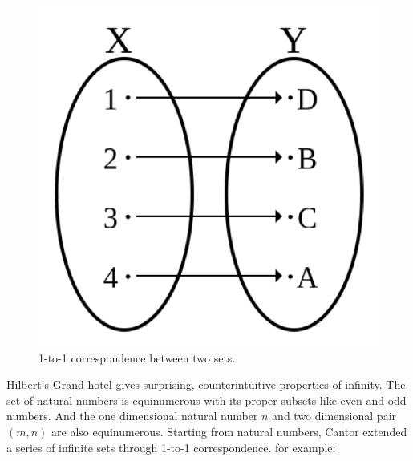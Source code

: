 \documentclass{article}
\begin{document}
\begin{figure}[htbp]
 \centering
 \includegraphics[scale=0.4]{img/bijection.png}
 \caption{1-to-1 correspondence between two sets.}
 \label{fig:bijection}
\end{figure}

Hilbert's Grand hotel gives surprising, counterintuitive properties of infinity. The set of natural numbers is equinumerous with its proper subsets like even and odd numbers. And the one dimensional natural number $n$ and two dimensional pair $(m, n)$ are also equinumerous. Starting from natural numbers, Cantor extended a series of infinite sets through 1-to-1 correspondence. for example:
\end{document}
